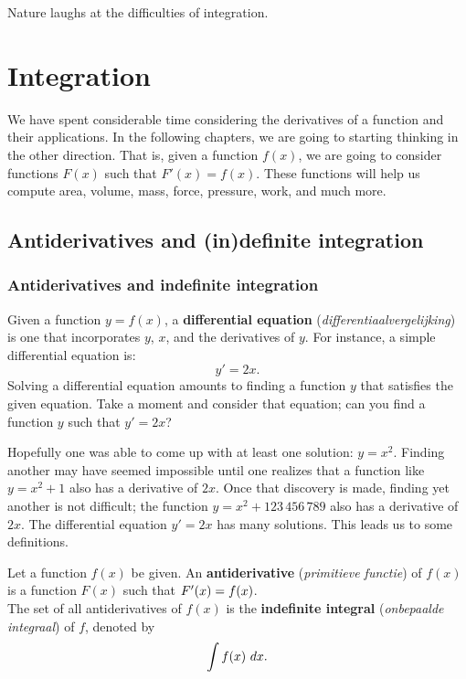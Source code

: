 \begin{savequote}[75mm]
Nature laughs at the difficulties of integration.
\end{savequote}


\chapter{Integration}
\label{chap_int}
\graphicspath{{figures/Int/}}

We have spent considerable time considering the derivatives of a function and their applications. In the following chapters, we are going to starting thinking in the other direction. That is, given a function $f(x)$, we are going to consider functions $F(x)$ such that $F'(x) = f(x)$. These functions will help us compute area, volume, mass, force, pressure, work, and much more.



\section{Antiderivatives and (in)definite integration}\label{sec:antider}
\subsection{Antiderivatives and indefinite integration}
Given a function $y=f(x)$, a \textbf{differential equation} (\textit{differentiaalvergelijking})  is one that incorporates $y$, $x$, and the derivatives of $y$. For instance, a simple differential equation is: $$y' = 2x.$$
Solving a differential equation amounts to finding a function $y$ that satisfies the given equation. Take a moment and consider that equation; can you find a function $y$ such that $y' = 2x$?

Hopefully one was able to come up with at least one solution: $y = x^2$. Finding another may have seemed impossible until one realizes that a function like $y=x^2+1$ also has a derivative of $2x$. Once that discovery is made, finding yet another is not difficult; the function $y = x^2 + 123\,456\,789$ also has a derivative of $2x$. The differential equation $y' = 2x$ has many solutions. This leads us to some definitions.

\begin{definition}\label{def:antider}
Let a function $f(x)$ be given. An \textbf{antiderivative} (\textit{primitieve functie}) of $f(x)$ is a function $F(x)$ such that $F'(x) = f(x)$.\\

The set of all antiderivatives of $f(x)$ is the \textbf{indefinite integral} (\textit{onbepaalde integraal}) of $f$, denoted by $$\displaystyle\int f(x) \ dx.$$
\end{definition}

